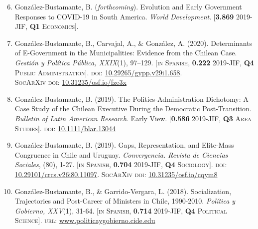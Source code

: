 \documentclass[letterpaper,margin]{res}
\newenvironment{benumerate}[1]{
    \let\oldItem\item
    \def\item{\addtocounter{enumi}{-2}\oldItem}
    \begin{enumerate}
    \setcounter{enumi}{#1}
    \addtocounter{enumi}{1}
}{
    \end{enumerate}
}
\begin{document}
\begin{resume}
\begin{benumerate}{5}
\item{\small Gonz\'alez-Bustamante, B. ({\itshape forthcoming}). Evolution and Early Government Responses to COVID-19 in South America. {\itshape World Development}. {\footnotesize \scshape [{\bfseries \small 3.869} 2019-JIF, {\bfseries \small Q1} Economics]}.}\vspace{1mm}

\item{\small Gonz\'alez-Bustamante, B., Carvajal, A., \& Gonz\'alez, A. (2020). Determinants of E-Government in the Municipalities: Evidence from the Chilean Case. {\itshape Gesti\'on y Pol\'itica P\'ublica, XXIX}(1), 97--129. {\footnotesize \scshape [in Spanish, {\bfseries \small 0.222} 2019-JIF, {\bfseries \small Q4} Public Administration]}. {\scshape doi:} \href{http://dx.doi.org/10.29265/gypp.v29i1.658}{10.29265/gypp.v29i1.658}. \\ {\scshape {\footnotesize SocArXiv} doi}: \href{https://doi.org/10.31235/osf.io/fze3x}{10.31235/osf.io/fze3x}}\vspace{1mm}

\item{\small Gonz\'alez-Bustamante, B. (2019). The Politics-Administration Dichotomy: A Case Study of the Chilean Executive During the Democratic Post-Transition. {\itshape Bulletin of Latin American Research}. Early View. {\footnotesize \scshape [{\bfseries \small 0.586} 2019-JIF, {\bfseries \small Q3} Area Studies]}. {\scshape doi}: \href{https://doi.org/10.1111/blar.13044}{10.1111/blar.13044}}\vspace{1mm}

\item{\small Gonz\'alez-Bustamante, B. (2019). Gaps, Representation, and Elite-Mass Congruence in Chile and Uruguay. {\itshape Convergencia. Revista de Ciencias Sociales}, (80), 1-27. {\footnotesize \scshape [in Spanish, {\bfseries \small 0.704} 2019-JIF, {\bfseries \small Q4} Sociology]}. {\scshape doi}: \href{https://doi.org/10.29101/crcs.v26i80.11097}{10.29101/crcs.v26i80.11097}. {\scshape {\footnotesize SocArXiv} doi}: \href{https://doi.org/10.31235/osf.io/cqym8}{10.31235/osf.io/cqym8}}\vspace{1mm}

\item{\small Gonz\'alez-Bustamante, B., \& Garrido-Vergara, L. (2018). Socialization, Trajectories and Post-Career of Ministers in Chile, 1990-2010. {\itshape Pol\'itica y Gobierno, XXV}(1), 31-64. {\footnotesize \scshape [in Spanish, {\bfseries \small 0.714} 2019-JIF, {\bfseries \small Q4} Political Science]}. {\scshape url}: \href{http://www.politicaygobierno.cide.edu/index.php/pyg/article/view/1080}{www.politicaygobierno.cide.edu}}
\end{benumerate}


\end{resume}
\end{document}
